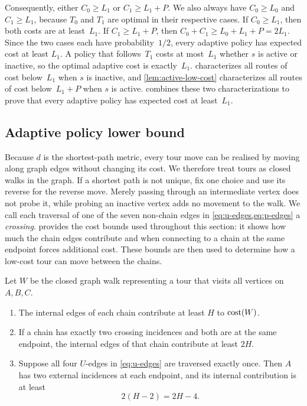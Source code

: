 \documentclass[12pt,a4paper,oneside]{report}
\begin{document}
Consequently, either $C_0\ge L_1$ or $C_1\ge L_1+P$.  We also always have
$C_0\ge L_0$ and $C_1\ge L_1$, because $T_0$ and $T_1$ are optimal in their
respective cases.  If $C_0\ge L_1$, then both costs are at least~$L_1$.  If
$C_1\ge L_1+P$, then $C_0+C_1\ge L_0+L_1+P=2L_1$.  Since the two cases each
have probability~$1/2$, every adaptive policy has expected cost at least
$L_1$.  A policy that follows~$T_1$ costs at most~$L_1$ whether $s$ is active
or inactive, so the optimal adaptive cost is exactly~$L_1$.
 characterizes all routes of cost below~$L_1$
when $s$ is inactive, and \cref{lem:active-low-cost} characterizes all routes
of cost below~$L_1+P$ when $s$ is active.
 combines these two characterizations to prove
that every adaptive policy has expected cost at least~$L_1$.

\subsection{Adaptive policy lower bound}
\label{sec:three-chain-low-cost-routes}

Because $d$ is the shortest-path metric, every tour move can be realised by moving along
graph edges without changing its cost.  We therefore treat tours as
closed walks in the graph.  If a shortest path is not unique, fix one choice
and use its reverse for the reverse move.  Merely passing through an
intermediate vertex does not probe it, while probing an inactive vertex adds
no movement to the walk.
We call each traversal of one of the seven non-chain edges in
\cref{eq:u-edges,eq:p-edges} a \emph{crossing}.  
provides the cost bounds used throughout this section: it shows how much the
chain edges contribute and when connecting to a chain at the same endpoint
forces additional cost.  These bounds are then used to determine how a
low-cost tour can move between the chains.

\begin{lemma}\label{lem:chain-contribution}
Let $W$ be the closed graph walk representing a tour that visits all vertices
on $A,B,C$.
\begin{enumerate}[label=(\roman*)]
  \item The internal edges of each chain contribute at least $H$ to
  $\operatorname{cost}(W)$.
  \item If a chain has exactly two crossing incidences and both are at the
  same endpoint, the internal edges of that chain contribute at least $2H$.
  \item Suppose all four $U$-edges in \cref{eq:u-edges} are traversed
  exactly once.  Then $A$ has two external incidences at each endpoint, and
  its internal contribution is at least
  \[
    2(H-2)=2H-4.
  \]
\end{enumerate}
\end{lemma}
\end{document}
